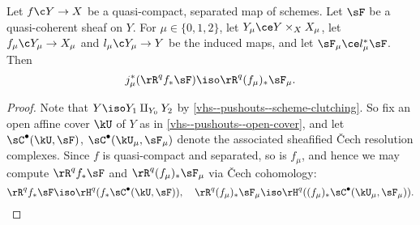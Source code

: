 \begin{proposition}
  \label{vhs--pushouts--cohomology}
  Let $f \c Y \to X$ be a quasi-compact, separated map of schemes. Let $\sF$ be a quasi-coherent sheaf on $Y$. For $\mu \in \{0,1,2\}$, let $Y_\mu \ce Y \times_X X_{\mu}$, let $f_\mu \c Y_\mu \to X_\mu$ and $l_\mu \c Y_\mu \to Y$ be the induced maps, and let $\sF_\mu \ce l_\mu^*\sF$. Then
  \[
    j_\mu^*(\rR^qf_*\sF) \iso \rR^q(f_\mu)_*\sF_\mu.
  \]
\end{proposition}

\begin{proof}
  Note that $Y \iso Y_1 \amalg_{Y_0} Y_2$ by \cref{vhs--pushouts--scheme-clutching}. So fix an open affine cover $\kU$ of $Y$ as in \cref{vhs--pushouts--open-cover}, and let $\sC^\bullet(\kU,\sF)$, $\sC^\bullet(\kU_\mu,\sF_\mu)$ denote the associated sheafified \v{C}ech resolution complexes. Since $f$ is quasi-compact and separated, so is $f_\mu$, and hence we may compute $\rR^qf_*\sF$ and $\rR^q(f_\mu)_*\sF_\mu$ via \v{C}ech cohomology:
  \[
    \rR^qf_*\sF \iso \rH^q(f_*\sC^\bullet(\kU,\sF)), \quad
    \rR^q(f_\mu)_*\sF_\mu \iso \rH^q((f_\mu)_*\sC^\bullet(\kU_\mu,\sF_\mu)).
  \]
\end{proof}

